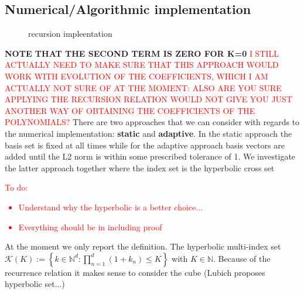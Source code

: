 \usepackage{amsmath}
\usepackage{pgfplots}
\pgfplotsset{compat=1.11}

\subsection{Numerical/Algorithmic implementation}
\begin{figure}[h!]
    \centering
    \caption{recursion impleentation}
    \label{fig:recursion-impleentation}
\end{figure}
\textbf{NOTE THAT THE SECOND TERM IS ZERO FOR K=0}
\textcolor{red}{I STILL ACTUALLY NEED TO MAKE SURE THAT 
THIS APPROACH WOULD WORK WITH EVOLUTION OF THE COEFFICIENTS, 
WHICH I AM ACTUALLY NOT SURE OF AT THE MOMENT: ALSO ARE YOU SURE
APPLYING THE RECURSION RELATION WOULD NOT GIVE YOU JUST ANOTHER 
WAY OF OBTAINING THE COEFFICIENTS OF THE POLYNOMIALS?}
There are two approaches that we can consider with regards 
to the numerical implementation: \textbf{static} and \textbf{adaptive}.
In the static approach the basis set is fixed at all times while for the 
adaptive approach basis vectors are added until the L2 norm is within some 
prescribed tolerance of 1. We investigate the latter approach together 
where the index set is the hyperbolic cross set 
\textcolor{red}{To do:
\begin{itemize}
  \item Understand why the hyperbolic is a better choice...
  \item Everything should be in \cite{lubichQuantumClassicalMolecular2008}
    including proof
\end{itemize}}
At the moment we only report the definition. The hyperbolic 
multi-index set 
$\mathcal{K}(K) := 
\left\{ k \in \mathbb{N}^d: \prod_{n=1}^d (1 + k_n) \leq K \right\}$ with  $K \in \mathbb{N}$. 
Because of the recurrence relation it makes sense to 
consider the cube (Lubich proposes hyperbolic set...)
